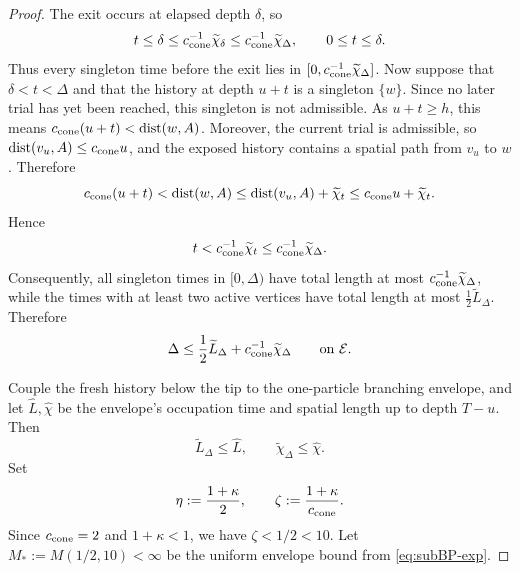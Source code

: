\documentclass[letterpaper,11pt,reqno]{amsart}
\theoremstyle{definition}
\begin{document}
\begin{proof}
The exit occurs at elapsed depth \(\delta\), so
\[
t\le\delta
\le c_{\rm cone}^{-1}\widetilde\chi_\delta
\le c_{\rm cone}^{-1}\widetilde\chi_\Delta,
\qquad 0\le t\le\delta.
\]
Thus every singleton time before the exit lies in
\([0,c_{\rm cone}^{-1}\widetilde\chi_\Delta]\).
%
Now suppose that \(\delta<t<\Delta\) and that the history at depth \(u+t\)
is a singleton \(\{w\}\). Since no later trial has yet been reached, this
singleton is not admissible. As \(u+t\ge h\), this means
$c_{\rm cone}(u+t)
<\operatorname{dist}(w,A)$.
Moreover, the current trial is admissible, so
\(\operatorname{dist}(v_u,A)\le c_{\rm cone}u\), and the exposed history
contains a spatial path from \(v_u\) to \(w\). Therefore
\[
c_{\rm cone}(u+t)
<\operatorname{dist}(w,A)
\le\operatorname{dist}(v_u,A)+\widetilde\chi_t
\le c_{\rm cone}u+\widetilde\chi_t.
\]
Hence
\[
t<c_{\rm cone}^{-1}\widetilde\chi_t
\le c_{\rm cone}^{-1}\widetilde\chi_\Delta.
\]
Consequently, all singleton times in \([0,\Delta)\) have total length at
most \(c_{\rm cone}^{-1}\widetilde\chi_\Delta\), while the times with at least
two active vertices have total length at most
\(\frac12\widetilde L_\Delta\). Therefore
\begin{equation}\label{eq:cycle-delay}
        \Delta
        \le \frac12\widetilde L_\Delta
        +c_{\rm cone}^{-1}\widetilde\chi_\Delta
        \qquad\text{on }\mathcal E.
\end{equation}


Couple the fresh history below the tip to the one-particle branching
envelope, and let \(\widehat L,\widehat\chi\) be the envelope's occupation
time and spatial length up to depth \(T-u\). Then
\[
        \widetilde L_\Delta\le\widehat L,
        \qquad
        \widetilde\chi_\Delta\le\widehat\chi.
\]
Set
\[
        \eta:=\frac{1+\kappa}{2},
        \qquad
        \zeta:=\frac{1+\kappa}{c_{\rm cone}}.
\]
Since \(c_{\rm cone}=2\) and \(1+\kappa<1\), we have \(\zeta<1/2<10\). Let
\(M_*:=M(1/2,10)<\infty\) be the uniform envelope bound from
\eqref{eq:subBP-exp}.









\end{proof}
\end{document}
